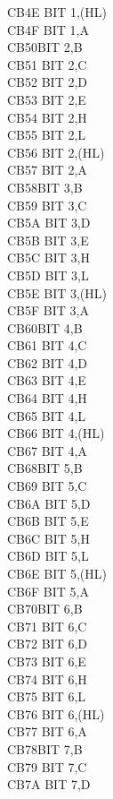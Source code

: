 \documentclass[oneside,a4paper]{book}
\begin{document}
\begin{multicols}{3}
{\begin{tabbing}
CB4E\> 	BIT 1,(HL)\\
CB4F\> 	BIT 1,A\\
CB50\>BIT 2,B\\
CB51\> 	BIT 2,C\\
CB52\> 	BIT 2,D\\
CB53\> 	BIT 2,E\\
CB54\> 	BIT 2,H\\
CB55\> 	BIT 2,L\\
CB56\> 	BIT 2,(HL)\\
CB57\> 	BIT 2,A\\
CB58\>BIT 3,B\\
CB59\> 	BIT 3,C\\
CB5A\> 	BIT 3,D\\
CB5B\> 	BIT 3,E\\
CB5C\> 	BIT 3,H\\
CB5D\> 	BIT 3,L\\
CB5E\> 	BIT 3,(HL)\\
CB5F\> 	BIT 3,A\\
CB60\>BIT 4,B\\
CB61\> 	BIT 4,C\\
CB62\> 	BIT 4,D\\
CB63\> 	BIT 4,E\\
CB64\> 	BIT 4,H\\
CB65\> 	BIT 4,L\\
CB66\> 	BIT 4,(HL)\\
CB67\> 	BIT 4,A\\
CB68\>BIT 5,B\\
CB69\> 	BIT 5,C\\
CB6A\> 	BIT 5,D\\
CB6B\> 	BIT 5,E\\
CB6C\> 	BIT 5,H\\
CB6D\> 	BIT 5,L\\
CB6E\> 	BIT 5,(HL)\\
CB6F\> 	BIT 5,A\\
CB70\>BIT 6,B\\
CB71\> 	BIT 6,C\\
CB72\> 	BIT 6,D\\
CB73\> 	BIT 6,E\\
CB74\> 	BIT 6,H\\
CB75\> 	BIT 6,L\\
CB76\> 	BIT 6,(HL)\\
CB77\> 	BIT 6,A\\
CB78\>BIT 7,B\\
CB79\> 	BIT 7,C\\
CB7A\> 	BIT 7,D\\

\end{tabbing}}
\end{multicols}
\end{document}
